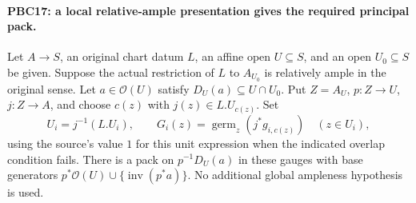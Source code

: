 \documentclass[11pt,a4paper]{article}
\numberwithin{equation}{section}
\theoremstyle{remark}\newtheorem{remark}[theorem]{Remark}
\begin{document}
\paragraph{PBC17: a local relative-ample presentation gives the required principal pack.}
\label{claim:PBC17}
Let $A\to S$, an original chart datum $L$, an affine open
$U\subseteq S$, and an open $U_0\subseteq S$ be given.
Suppose the actual restriction of $L$ to $A_{U_0}$ is
relatively ample in the original sense.
Let $a\in\mathcal O(U)$ satisfy
$D_U(a)\subseteq U\cap U_0$.
Put $Z=A_U$, $p:Z\to U$, $j:Z\to A$, and choose $c(z)$ with
$j(z)\in L.U_{c(z)}$.
Set
\[
 U_i=j^{-1}(L.U_i),\qquad
 G_i(z)=\operatorname{germ}_z(j^*g_{i,c(z)})
                 \quad(z\in U_i),
                                                        \tag{PBC.34}
\]
using the source's value $1$ for this unit expression when the
indicated overlap condition fails.
There is a pack on $p^{-1}D_U(a)$ in these gauges with base
generators $p^*\mathcal O(U)\cup\{\operatorname{inv}(p^*a)\}$.
No additional global ampleness hypothesis is used.
\end{document}
